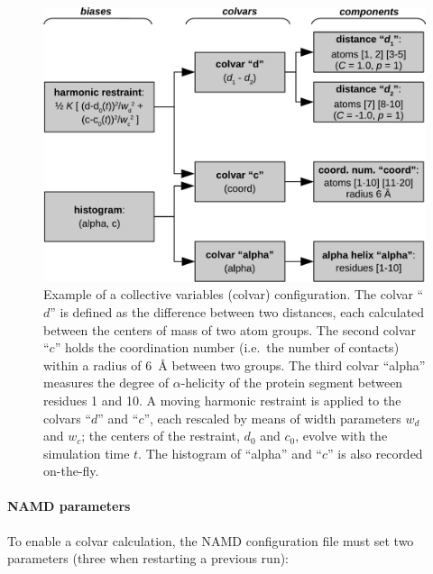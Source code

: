 \begin{figure}[!ht]
  \centering
  \includegraphics[width=12cm]{figures/colvars_diagram}
  \caption{Example of a collective variables (colvar) configuration.
    The colvar ``$d$'' is defined as the difference between two
    distances, each calculated between the centers of mass of two
    atom groups.  The second colvar ``$c$'' holds the coordination
    number (i.e.~the number of contacts) within a radius of 6~\AA{}
    between two groups.  The third colvar ``alpha'' measures the
    degree of $\alpha$-helicity of the protein segment between
    residues 1 and 10. A moving harmonic restraint is applied to the
    colvars ``$d$'' and ``$c$'', each rescaled by means of width
    parameters $w_{d}$ and $w_{c}$; the centers of the restraint,
    $d_0$ and $c_0$, evolve with the simulation time $t$.  The
    histogram of ``alpha'' and ``$c$'' is also recorded on-the-fly.}
  \label{fig:colvars_diagram}
\end{figure}


\paragraph*{NAMD parameters}

To enable a colvar calculation, the NAMD configuration file must
set two parameters (three when restarting a previous run):

